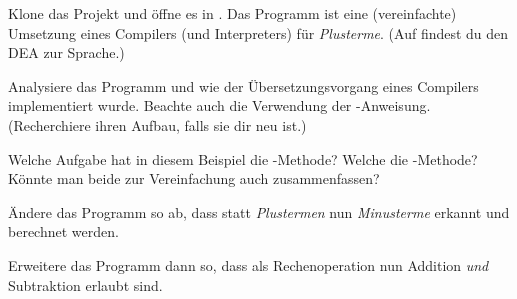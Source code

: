 \documentclass[10pt, a4paper, ngerman]{scrartcl}
\begin{document}

\begin{aufgabe}[subtitle=Funktionsweise eines Compilers]
	\label{aufg:compiler}
	Klone das Projekt  und öffne es in .
	Das Programm ist eine (vereinfachte) Umsetzung eines Compilers (und Interpreters) für
	\emph{Plusterme}. (Auf  findest du den DEA zur Sprache.)

	Analysiere das Programm und wie der Übersetzungsvorgang eines Compilers
	implementiert wurde. Beachte auch die Verwendung der -Anweisung. (Recherchiere
	ihren Aufbau, falls sie dir neu ist.)

	Welche Aufgabe hat in diesem Beispiel die -Methode? Welche die -Methode?
	Könnte man beide zur Vereinfachung auch zusammenfassen?

\end{aufgabe}

\begin{aufgabe}[subtitle=Minusterme]
	\label{aufg:subtraktion}

	\begin{enuma}
		\item Ändere das Programm so ab, dass statt \emph{Plustermen} nun \emph{Minusterme} erkannt und
		berechnet werden.

		\item Erweitere das Programm dann so, dass als Rechenoperation nun Addition \emph{und}
		Subtraktion erlaubt sind.
	\end{enuma}
\end{aufgabe}
\end{document}
